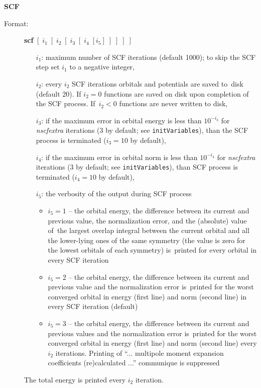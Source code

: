 \documentclass[10pt,a4paper]{article}
\newcommand{\ft}[1]{\texttt{#1}}
\begin{document}
\begin{description}
\item \textbf{SCF}
\begin{description}
\item[Format:] \textbf{scf}
$[\;i_1\;[\;i_2\;[\;i_3\;[\;i_4\;[i_5]\;]\;]\;]\;]$
\begin{itemize}
\item[$i_1$:] maximum number of SCF iterations (default 1000); to skip the
  SCF step set $i_1$ to a negative integer,
\item[$i_2$:] every $i_2$ SCF iterations orbitals and potentials are saved
  to~disk (default 20).  If $i_2=0$ functions are saved on disk upon
  completion of the SCF process. If~$i_2<0$ functions are never written to
  disk,
\item[$i_3$:] if the maximum error in orbital energy is less than
  $10^{-i_3}$ for \textsl{nscfextra} iterations (3 by default; see
  \ft{initVariables}), than the SCF process is terminated ($i_3=10$ by default),
\item[$i_4$:] if the maximum error in orbital norm is less than $10^{-i_4}$
  for \textsl{nscfextra} iterations (3 by default; see \ft{initVariables}), than
  SCF process is terminated ($i_4=10$ by default),
\item[$i_5$:] the verbosity of the output during SCF process
\begin{itemize}
\item $i_5=1$ -- the orbital energy, the difference between its current and previous
  value, the normalization error, and the (absolute) value of~the largest overlap integral
  between the current orbital and all the lower-lying ones of the same symmetry (the value
  is zero for the lowest orbitals of each symmetry) is~printed for every orbital in every
  SCF iteration
\item $i_5=2$ -- the orbital energy, the difference between its current and previous value
  and the normalization error is~printed for the worst converged orbital in energy (first
  line) and norm (second line) in every SCF iteration (default)
\item $i_5=3$ -- the orbital energy, the difference between its current and previous values
  and the normalization error is~printed for the worst converged orbital in energy (first
  line) and norm (second line) every $i_2$ iterations. Printing of ``... multipole moment
  expansion coefficients (re)calculated ...''  communique is suppressed
\end{itemize}
\end{itemize}
The total energy is printed every $i_2$ iteration.
\end{description}


\end{description}
\end{document}
